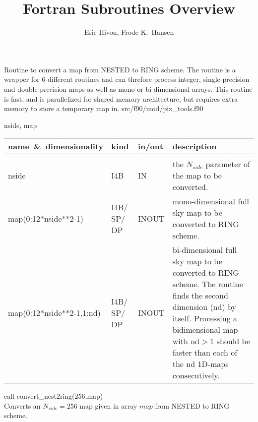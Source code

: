 
\sloppy


\title{\healpix Fortran Subroutines Overview}
 \section[convert\_nest2ring*]{ }
\label{sub:convert_nest2ring}
\author{Eric Hivon, Frode K.~Hansen}


\begin{facility}
{Routine to convert a \healpix map from NESTED to RING scheme. \newline
The routine is a
  wrapper for 6 different routines and can threfore process
  integer, single precision and double precision maps as well as mono or bi
  dimensional arrays. \newline This routine is fast, and is parallelized for shared memory
architecture, but requires extra memory to store a temporary map in. }
{src/f90/mod/pix\_tools.f90}
\end{facility}

\begin{f90format}
{nside, map}
\end{f90format}

\begin{arguments}
{
\begin{tabular}{p{0.4\hsize} p{0.05\hsize} p{0.1\hsize} p{0.35\hsize}} \hline  
\textbf{name~\&~dimensionality} & \textbf{kind} & \textbf{in/out} & \textbf{description} \\ \hline
                   &   &   &                           \\ %
nside & I4B & IN & the $N_{side}$ parameter of the map to be converted. \\
map(0:12*nside**2-1) & I4B/ SP/ DP & INOUT & mono-dimensional full sky map to be converted to RING scheme. \\
map(0:12*nside**2-1,1:nd) & I4B/ SP/ DP & INOUT & bi-dimensional full sky map to
                   be converted to RING scheme. The routine finds the second
                   dimension (nd) by itself. Processing a bidimensional map with nd$>1$ should be
                   faster than each of the nd 1D-maps consecutively.
\end{tabular}
}
\end{arguments}

\begin{example}
{
call convert\_nest2ring(256,map)  \\
}
{
Converts an $N_{side}=256$ map given in array $map$ from NESTED to RING scheme.
}
\end{example}

